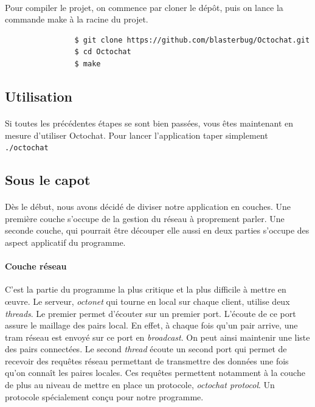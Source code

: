 \documentclass[a4paper]{article}
\begin{document}
			\paragraph{}{
				Pour compiler le projet, on commence par cloner le dépôt, puis on lance la commande make à la racine du projet.
			}
			
			\begin{verbatim}
				$ git clone https://github.com/blasterbug/Octochat.git
				$ cd Octochat
				$ make
			\end{verbatim}
		
		\subsection{Utilisation}
			\paragraph{}{
			Si toutes les précédentes étapes se sont bien passées, vous êtes maintenant en mesure d'utiliser Octochat.
			Pour lancer l'application taper simplement \verb|./octochat|
			}
		
		\subsection{Sous le capot}
			\paragraph{}{
			Dès le début, nous avons décidé de diviser notre application en couches.
			Une première couche s'occupe de la gestion du réseau à proprement parler. Une seconde couche, qui pourrait être découper elle aussi en deux parties s'occupe des aspect applicatif du programme.
			}
			
			\paragraph{Couche réseau}{
			C'est la partie du programme la plus critique et la plus difficile à mettre en œuvre.
			Le serveur, \textit{octonet} qui tourne en local sur chaque client, utilise deux \textit{threads}.
			Le premier permet d'écouter sur un premier port. L'écoute de ce port assure le maillage des pairs local. 
			En effet, à chaque fois qu'un pair arrive, une tram réseau est envoyé sur ce port en \textit{broadcast}. On peut ainsi maintenir une liste des pairs connectées.
			Le second \textit{thread} écoute un second port qui permet de recevoir des requêtes réseau permettant de 
			transmettre des données une fois qu'on connaît les paires locales. Ces requêtes permettent notamment à 
			la couche de plus au niveau de mettre en place un protocole, \textit{octochat protocol}. Un protocole
			spécialement conçu pour notre programme.
			}
			
\end{document}

